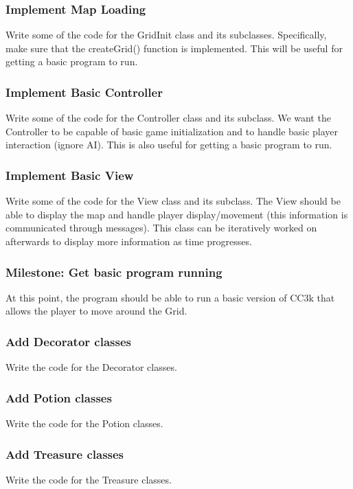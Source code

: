 \documentclass[12pt]{article}
\begin{document}
\subsubsection*{Implement Map Loading}
Write some of the code for the GridInit class and its subclasses. Specifically, make sure that the createGrid() function is implemented. This will be useful for getting a basic program to run.


\subsubsection*{Implement Basic Controller}
Write some of the code for the Controller class and its subclass. We want the Controller to be capable of basic game initialization and to handle basic player interaction (ignore AI). This is also useful for getting a basic program to run.


\subsubsection*{Implement Basic View}
Write some of the code for the View class and its subclass. The View should be able to display the map and handle player display/movement (this information is communicated through messages). This class can be iteratively worked on afterwards to display more information as time progresses.


\subsubsection*{Milestone: Get basic program running}
At this point, the program should be able to run a basic version of CC3k that allows the player to move around the Grid.


\subsubsection*{Add Decorator classes}
Write the code for the Decorator classes.


\subsubsection*{Add Potion classes}
Write the code for the Potion classes.


\subsubsection*{Add Treasure classes}
Write the code for the Treasure classes.
\end{document}
